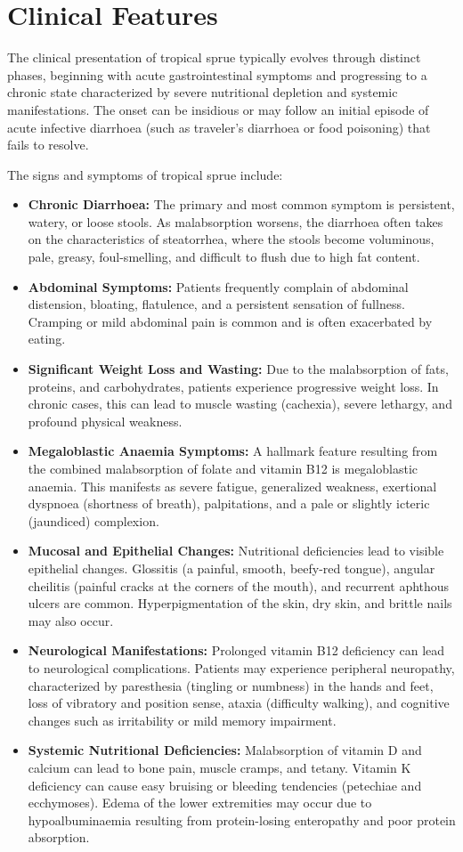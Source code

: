 \section*{Clinical Features}
The clinical presentation of tropical sprue typically evolves through distinct phases, beginning with acute gastrointestinal symptoms and progressing to a chronic state characterized by severe nutritional depletion and systemic manifestations. The onset can be insidious or may follow an initial episode of acute infective diarrhoea (such as traveler's diarrhoea or food poisoning) that fails to resolve.

The signs and symptoms of tropical sprue include:
\begin{itemize}
    \item \textbf{Chronic Diarrhoea:} The primary and most common symptom is persistent, watery, or loose stools. As malabsorption worsens, the diarrhoea often takes on the characteristics of steatorrhea, where the stools become voluminous, pale, greasy, foul-smelling, and difficult to flush due to high fat content.
    \item \textbf{Abdominal Symptoms:} Patients frequently complain of abdominal distension, bloating, flatulence, and a persistent sensation of fullness. Cramping or mild abdominal pain is common and is often exacerbated by eating.
    \item \textbf{Significant Weight Loss and Wasting:} Due to the malabsorption of fats, proteins, and carbohydrates, patients experience progressive weight loss. In chronic cases, this can lead to muscle wasting (cachexia), severe lethargy, and profound physical weakness.
    \item \textbf{Megaloblastic Anaemia Symptoms:} A hallmark feature resulting from the combined malabsorption of folate and vitamin B12 is megaloblastic anaemia. This manifests as severe fatigue, generalized weakness, exertional dyspnoea (shortness of breath), palpitations, and a pale or slightly icteric (jaundiced) complexion.
    \item \textbf{Mucosal and Epithelial Changes:} Nutritional deficiencies lead to visible epithelial changes. Glossitis (a painful, smooth, beefy-red tongue), angular cheilitis (painful cracks at the corners of the mouth), and recurrent aphthous ulcers are common. Hyperpigmentation of the skin, dry skin, and brittle nails may also occur.
    \item \textbf{Neurological Manifestations:} Prolonged vitamin B12 deficiency can lead to neurological complications. Patients may experience peripheral neuropathy, characterized by paresthesia (tingling or numbness) in the hands and feet, loss of vibratory and position sense, ataxia (difficulty walking), and cognitive changes such as irritability or mild memory impairment.
    \item \textbf{Systemic Nutritional Deficiencies:} Malabsorption of vitamin D and calcium can lead to bone pain, muscle cramps, and tetany. Vitamin K deficiency can cause easy bruising or bleeding tendencies (petechiae and ecchymoses). Edema of the lower extremities may occur due to hypoalbuminaemia resulting from protein-losing enteropathy and poor protein absorption.
\end{itemize}

